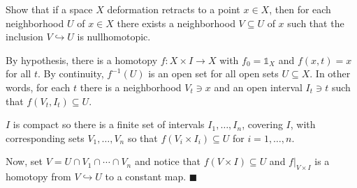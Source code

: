 \question Show that if a space $X$ deformation retracts to a point $x \in X$,
then for each neighborhood $U$ of $x \in X$ there exists a neighborhood $V
\subseteq U$ of $x$ such that the inclusion $V \hookrightarrow U$ is
nullhomotopic.


\begin{solution}
    By hypothesis, there is a homotopy $f: X \times I \rightarrow X$ with $f_0 =
    \mathbb{1}_X$ and $f(x,t) = x$ for all $t$. By continuity, $f^{-1}(U)$ is an
    open set for all open sets $U \subseteq X$. In other words, for each $t$
    there is a neighborhood $V_t \ni x$ and an open interval $I_t \ni t$ such
    that $f(V_t, I_t) \subseteq U$.

    $I$ is compact so there is a finite set of intervals $I_1, \ldots, I_n$,
    covering $I$, with corresponding sets $V_1, \ldots, V_n$ so that $f(V_i
    \times I_i) \subseteq U$ for $i = 1, \ldots, n$. 

    Now, set $V = U \cap V_1 \cap \cdots \cap V_n$ and notice that $f(V \times
    I) \subseteq U$ and $f\rvert_{V \times I}$ is a homotopy from $V
    \hookrightarrow U$ to a constant map. \hfill $\blacksquare$
\end{solution}